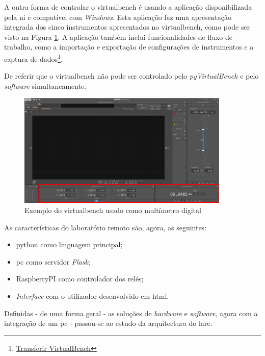 A outra forma de controlar o \acrshort{virtualbench} é usando a aplicação disponibilizada pela \acrshort{ni}  e compatível com \textit{Windows}. Esta aplicação faz uma apresentação integrada dos cinco instrumentos apresentados no \acrshort{virtualbench}, como pode ser visto na Figura \ref{fig:leituraohm}. A aplicação também inclui funcionalidades de fluxo de trabalho, como a importação e exportação de configurações de instrumentos e a captura de dados\footnote{\href{https://www.ni.com/en/support/downloads/drivers/download.virtualbench-software.html}{Transferir VirtualBench}}.

De referir que o \acrshort{virtualbench} não pode ser controlado pelo \textit{pyVirtualBench} e pelo \textit{software} simultaneamente.

\begin{figure}[hbtp]
    \centering
    \includegraphics[width=0.9\textwidth]{figures/VB8012-OHM_Exemplo.png}
    \caption{Exemplo do \acrshort{virtualbench} usado como multímetro digital}
    \label{fig:leituraohm}
\end{figure}

As características do \acrshort{laboratório remoto} são, agora, as seguintes:
\begin{itemize}
    \item \gls{python} como linguagem principal;
    \item \acrshort{pc} como servidor \textit{Flask};
    \item \gls{RaspberryPI} como controlador dos relés;
    \item \textit{Interface} com o utilizador desenvolvido em \acrshort{html}.
\end{itemize}

Definidas - de uma forma geral - as soluções de \textit{hardware} e \textit{software}, agora com a integração de um \acrshort{pc} - passou-se ao estudo da arquitectura do \acrshort{lare}.

